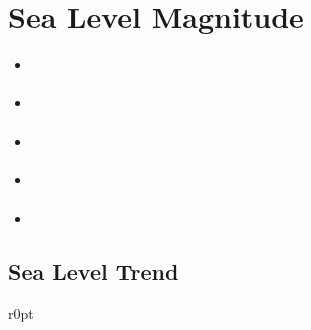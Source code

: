 \documentclass[letterpaper,10pt,english]{jupyterBook}
\begin{document}
\chapter{Sea Level Magnitude}
\label{\detokenize{notebooks/SL_annual:sea-level-magnitude}}\label{\detokenize{notebooks/SL_annual::doc}}\begin{itemize}
\item {} 
\sphinxAtStartPar
{\hyperref[\detokenize{notebooks/regional_and_local/SL_Trend::doc}]{}}

\item {} 
\sphinxAtStartPar
{\hyperref[\detokenize{notebooks/regional_and_local/SL_anomaly_annual::doc}]{}}

\item {} 
\sphinxAtStartPar
{\hyperref[\detokenize{notebooks/regional_and_local/SL_Rankings_annual::doc}]{}}

\item {} 
\sphinxAtStartPar
{\hyperref[\detokenize{notebooks/regional_and_local/SL_Extremes_annual::doc}]{}}

\item {} 
\sphinxAtStartPar
{\hyperref[\detokenize{notebooks/regional_and_local/SL_Components_annual::doc}]{}}

\end{itemize}

\sphinxstepscope


\section{Sea Level Trend}
\label{\detokenize{notebooks/regional_and_local/SL_Trend:sea-level-trend}}\label{\detokenize{notebooks/regional_and_local/SL_Trend::doc}}

\begin{wrapfigure}{r}{0pt}
\centering
\noindent{}
\end{wrapfigure}
\end{document}
